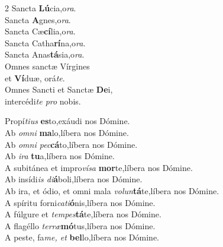 \begin{multicols}{2}
San\-cta \textbf{Lú}cia,\hfill o\textit{ra}.\\
San\-cta \textbf{A}gnes,\hfill o\textit{ra}.\\
San\-cta Cæ\textbf{cí}lia,\hfill o\textit{ra}.\\
San\-cta Catha\textbf{rí}na,\hfill o\textit{ra}.\\
San\-cta Anas\textbf{tá}sia,\hfill o\textit{ra}.\\
Omnes san\-ctæ Vírgines \\ \emspace et \textbf{Ví}duæ,
\hfill orá\textit{te}.\\
Omnes San\-cti et San\-ctæ \textbf{De}i,\\ 
\zeroptspace \hfill intercédi\textit{te pro} nobis.
\end {multicols}

%

\noindent
Propí\textit{tius} \textbf{es}to,\hfill exáudi nos Dómine.\\
Ab \textit{omni} \textbf{ma}lo,\hfill líbera nos Dómine.\\
Ab \textit{omni pec}\textbf{cá}to,\hfill líbera nos Dómine.\\
Ab \textit{ira} \textbf{tu}a,\hfill líbera nos Dómine.\\
A subitánea et impro\textit{vísa} \textbf{mor}te,\hfill líbera nos Dómine.\\
Ab insídi\textit{is di}\textbf{á}boli,\hfill líbera nos Dómine.\\
Ab ira, et ódio, et omni mala \textit{volun}\textbf{tá}te,\hfill líbera nos Dómine.\\
A spíritu forni\textit{cati}\textbf{ó}nis,\hfill líbera nos Dómine.\\
A fúlgure et \textit{tempes}\textbf{tá}te,\hfill líbera nos Dómine.\\
A flagéllo \textit{terræ}\textbf{mó}tus,\hfill líbera nos Dómine.\\
A peste, fa\textit{me, et} \textbf{bel}lo,\hfill líbera nos Dómine.

\myrule

